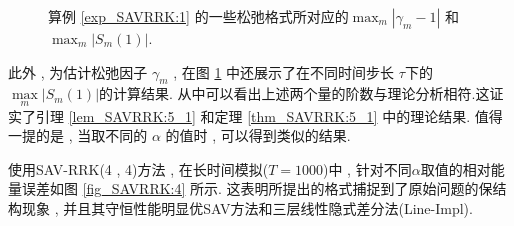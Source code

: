 \begin{figure}[H]
	\begin{center}
	\caption{算例 \ref{exp_SAVRRK:1} 的一些松弛格式所对应的$\max_m\left|\gamma_m-1\right|$ 和 $\max_m\left|S_m(1)\right|$.}
	\label{fig_SAVRRK:1}
	\end{center}
	\end{figure}

	此外 , 为估计松弛因子 $\gamma_m$ , 在图 \ref{fig_SAVRRK:1} 中还展示了在不同时间步长 $\tau$下的 $\max\limits _m\left|S_m(1)\right|$的计算结果.
	从中可以看出上述两个量的阶数与理论分析相符.这证实了引理 \ref{lem_SAVRRK:5_1} 和定理 \ref{thm_SAVRRK:5_1} 中的理论结果.
	值得一提的是 , 当取不同的 $\alpha$ 的值时 , 可以得到类似的结果.%
	
			使用SAV-RRK(4 , 4)方法 , 在长时间模拟($T=1000$)中 , 针对不同$\alpha$取值的相对能量误差如图 \ref{fig_SAVRRK:4} 所示.
			这表明所提出的格式捕捉到了原始问题的保结构现象 , 并且其守恒性能明显优SAV方法\cite{chengConvergenceEnergyconservingScheme2022}和三层线性隐式差分法(Line-Impl)\cite{wangConservativeLinearizedDifference2015}.
			
